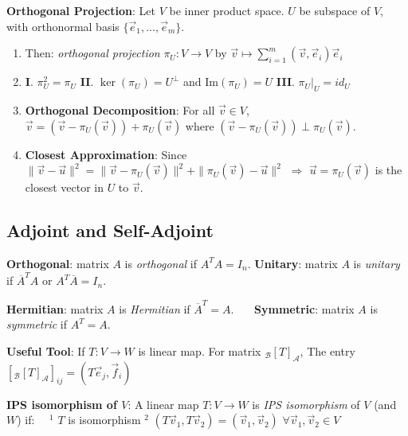 \documentclass[9pt]{article}
\begin{document}
\textbf{Orthogonal Projection}: Let $V$ be inner product space. \quad $U$ be subspace of $V$, with orthonormal basis $\{\vec{e}_1,...,\vec{e}_m\}$. 

\begin{enumerate}[itemsep=-2pt, topsep=-2pt]
    \item Then: \textit{orthogonal projection} $\pi_U:V\to V$ by $\vec{v}\mapsto\sum_{i=1}^m(\vec{v},\vec{e}_i)\vec{e}_i$
    \item \textbf{I}. $\pi^2_U=\pi_U$ \qquad \textbf{II}. $\ker(\pi_U)=U^\perp$ \quad and \quad $\text{Im}(\pi_U)=U$ \qquad \textbf{III}. $\pi_U|_U=id_U$
    \item \textbf{Orthogonal Decomposition}: For all $\vec{v}\in V$, $\vec{v}=(\vec{v}-\pi_U(\vec{v}))+\pi_U(\vec{v})$ where $(\vec{v}-\pi_U(\vec{v}))\perp \pi_U(\vec{v})$.
    \item \textbf{Closest Approximation}: Since $\|\vec{v}-\vec{u}\|^2=\|\vec{v}-\pi_U(\vec{v})\|^2+\|\pi_U(\vec{v})-\vec{u}\|^2$ \quad $\Rightarrow$ \quad $\vec{u}=\pi_U(\vec{v})$ is the closest vector in $U$ to $\vec{v}$.
\end{enumerate}


\subsection{Adjoint and Self-Adjoint} %

\textbf{Orthogonal}: {\small matrix $A$ is \textit{orthogonal} if $A^TA=I_n$. } \qquad \textbf{Unitary}: {\small matrix $A$ is \textit{unitary} if $\overline{A}^TA$ or $A^T\overline{A}=I_n$. }

\textbf{Hermitian}: {\small matrix $A$ is \textit{Hermitian} if $\overline{A}^T=A$. } \ \ \ \textbf{Symmetric}: {\small matrix $A$ is \textit{symmetric} if $A^T=A$.} 

\textbf{Useful Tool}: If $T:V\to W$ is linear map. \quad For matrix $_{\mathcal{B}}[T]_{\mathcal{A}}$, The entry $[_{\mathcal{B}}[T]_{\mathcal{A}}]_{ij}=(T\vec{e}_j,\vec{f}_i)$

\textbf{IPS isomorphism of $V$}: {\small A linear map $T:V\to W$ is \textit{IPS isomorphism} of $V$ (and $W$) if: \ \ $^1$ $T$ is isomorphism \quad $^2$ $(T\vec{v}_1,T\vec{v}_2)=(\vec{v}_1,\vec{v}_2)$ \quad $\forall \vec{v}_1,\vec{v}_2\in V$}
\end{document}
